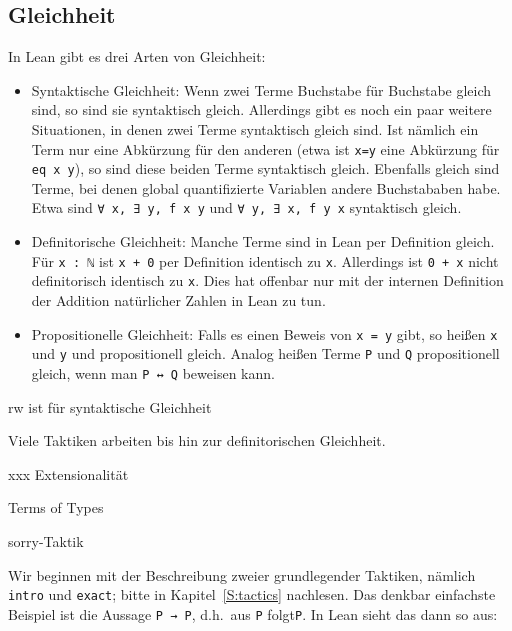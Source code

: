 \documentclass[11pt]{article}
\newcommand{\leanin}{\texttt}
\newcommand{\leanstate}{\texttt}
\begin{document}
\subsection{Gleichheit}
In Lean gibt es drei Arten von Gleichheit:
\begin{itemize}
\item Syntaktische Gleichheit: Wenn zwei Terme Buchstabe für Buchstabe gleich sind, so sind sie syntaktisch gleich. Allerdings gibt es noch ein paar weitere Situationen, in denen zwei Terme syntaktisch gleich sind. Ist nämlich ein Term nur eine Abkürzung für den anderen (etwa ist \leanstate{x=y} eine Abkürzung für \leanstate{eq x y}), so sind diese beiden Terme syntaktisch gleich. Ebenfalls gleich sind Terme, bei denen global quantifizierte Variablen andere Buchstababen habe. Etwa sind \leanstate{∀ x, ∃ y, f x y} und \leanstate{∀ y, ∃ x, f y x} syntaktisch gleich.
\item Definitorische Gleichheit: Manche Terme sind in Lean per Definition gleich. Für \leanstate{x : ℕ} ist \leanstate{x + 0} per Definition identisch zu \leanstate{x}. Allerdings ist  \leanstate{0 + x} nicht definitorisch identisch zu \leanstate{x}. Dies hat offenbar nur mit der internen Definition der Addition natürlicher Zahlen in Lean zu tun.
\item Propositionelle Gleichheit: Falls es einen Beweis von \leanstate{x = y} gibt, so heißen \leanstate{x} und \leanstate{y} und  propositionell gleich. Analog heißen Terme \leanstate{P} und  \leanstate{Q} propositionell gleich, wenn man \leanstate{P ↔ Q} beweisen kann. 
\end{itemize}
rw ist für syntaktische Gleichheit

Viele Taktiken arbeiten bis hin zur definitorischen Gleichheit.

xxx Extensionalität


Terms of Types

sorry-Taktik

Wir beginnen mit der Beschreibung zweier grundlegender Taktiken, nämlich \leanin{intro} und \leanin{exact}; bitte in Kapitel~\ref{S:tactics} nachlesen. Das denkbar einfachste Beispiel ist die Aussage \leanstate{P → P}, d.h.\ aus \leanstate{P} folgt\leanstate{P}. In Lean sieht das dann so aus:
\end{document}
